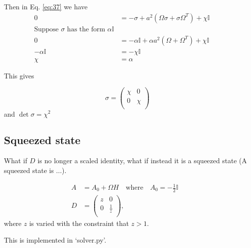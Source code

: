\documentclass[11pt,a4paper]{article}
\numberwithin{equation}{section}
\begin{document}
	
	Then in Eq. \ref{eq:37} we have 
	\begin{align*}
	0 &= -\sigma + a^2 (\Omega \sigma + \sigma \Omega^{T}) + \chi \mathbb{I}&\\
	\text{Suppose $\sigma$ has the form $\alpha \mathbb{I}$}&\\
	0 &= -\alpha \mathbb{I} + \alpha a^2 (\Omega + \Omega^T) + \chi \mathbb{I}&\\
	-\alpha \mathbb{I} & = -\chi \mathbb{I} & \tag*{as $\Omega$ is anti-symmetric}&\\
	\chi &= \alpha&
	\end{align*}
	
	This gives 
	
	\begin{equation*}
	\sigma = \begin{pmatrix}
	\chi & 0  \\
	0 & \chi\\
	\end{pmatrix}
	\end{equation*} and $\det \sigma = \chi^2$ 

	\subsection{Squeezed state}
	What if $D$ is no longer a scaled identity, what if instead it is a squeezed state (A squeezed state is ...).
	
	\begin{align*}
	A &= A_0 + \Omega H \quad\text{where}\quad A_0 = -\frac{1}{2}\mathbb{I}&\\
	D &= \begin{pmatrix}
	z & 0  \\
	0 & \frac{1}{z}\\
	\end{pmatrix},&
	\end{align*} where $z$ is varied with the constraint that $z>1$. 
	
	This is implemented in `solver.py'.
	
\end{document}
